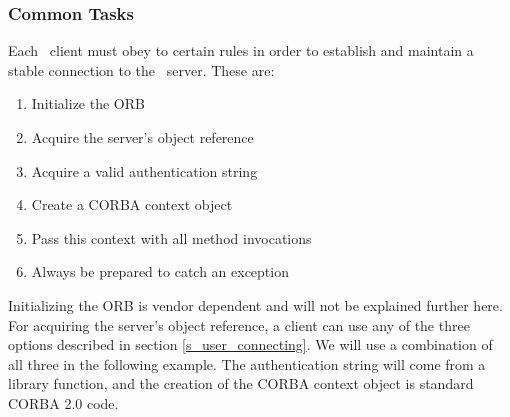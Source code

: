 \subsubsection{\label{s_user_using_common}Common Tasks}
Each \qidl\ client must obey to certain rules in order to establish and
maintain a stable connection to the \qidl\ server. These are:
\begin{enumerate}
\item Initialize the ORB
\item Acquire the server's object reference
\item Acquire a valid authentication string
\item Create a CORBA context object
\item Pass this context with all method invocations
\item \label{e_user_catch_exceptions}Always be prepared to catch an exception
\end{enumerate}
Initializing the ORB is vendor dependent and will not be explained further
here. For acquiring the server's object reference, a client can use any of
the three options described in section \ref{s_user_connecting}. We will use a
combination of all three in the following example. The authentication string
will come from a library function, and the creation of the CORBA context
object is standard CORBA 2.0 code.

